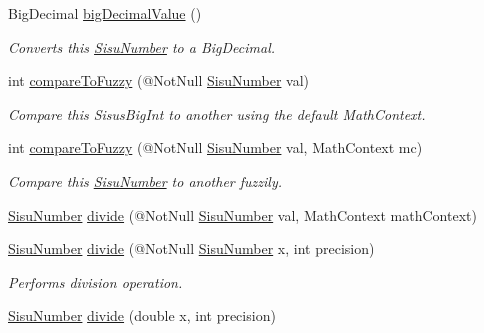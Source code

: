 \begin{DoxyCompactItemize}
Big\+Decimal \hyperlink{classcom_1_1aarrelaakso_1_1drawl_1_1_sisu_number_a75650999d142612f813ee7ba74ca1318}{big\+Decimal\+Value} ()
\begin{DoxyCompactList}\small\item\em Converts this \hyperlink{classcom_1_1aarrelaakso_1_1drawl_1_1_sisu_number}{Sisu\+Number} to a Big\+Decimal. \end{DoxyCompactList}\item 
int \hyperlink{classcom_1_1aarrelaakso_1_1drawl_1_1_sisu_number_aa4303cbb7e8c5a0e75ab000c2e71af72}{compare\+To\+Fuzzy} (@Not\+Null \hyperlink{classcom_1_1aarrelaakso_1_1drawl_1_1_sisu_number}{Sisu\+Number} val)
\begin{DoxyCompactList}\small\item\em Compare this Sisus\+Big\+Int to another using the default Math\+Context. \end{DoxyCompactList}\item 
int \hyperlink{classcom_1_1aarrelaakso_1_1drawl_1_1_sisu_number_a684749fbd84327a5142e33cd4939c7b1}{compare\+To\+Fuzzy} (@Not\+Null \hyperlink{classcom_1_1aarrelaakso_1_1drawl_1_1_sisu_number}{Sisu\+Number} val, Math\+Context mc)
\begin{DoxyCompactList}\small\item\em Compare this \hyperlink{classcom_1_1aarrelaakso_1_1drawl_1_1_sisu_number}{Sisu\+Number} to another fuzzily. \end{DoxyCompactList}\item 
\hyperlink{classcom_1_1aarrelaakso_1_1drawl_1_1_sisu_number}{Sisu\+Number} \hyperlink{classcom_1_1aarrelaakso_1_1drawl_1_1_sisu_number_af49c119c02144c6df4e2428d4be2ce63}{divide} (@Not\+Null \hyperlink{classcom_1_1aarrelaakso_1_1drawl_1_1_sisu_number}{Sisu\+Number} val, Math\+Context math\+Context)
\item 
\hyperlink{classcom_1_1aarrelaakso_1_1drawl_1_1_sisu_number}{Sisu\+Number} \hyperlink{classcom_1_1aarrelaakso_1_1drawl_1_1_sisu_number_a7ef7d7aece83861cfa1cc654af8f0d2e}{divide} (@Not\+Null \hyperlink{classcom_1_1aarrelaakso_1_1drawl_1_1_sisu_number}{Sisu\+Number} x, int precision)
\begin{DoxyCompactList}\small\item\em Performs division operation. \end{DoxyCompactList}\item 
\hyperlink{classcom_1_1aarrelaakso_1_1drawl_1_1_sisu_number}{Sisu\+Number} \hyperlink{classcom_1_1aarrelaakso_1_1drawl_1_1_sisu_number_a376cc656c9d4ea71eaccf66a61f10666}{divide} (double x, int precision)

\end{DoxyCompactItemize}
